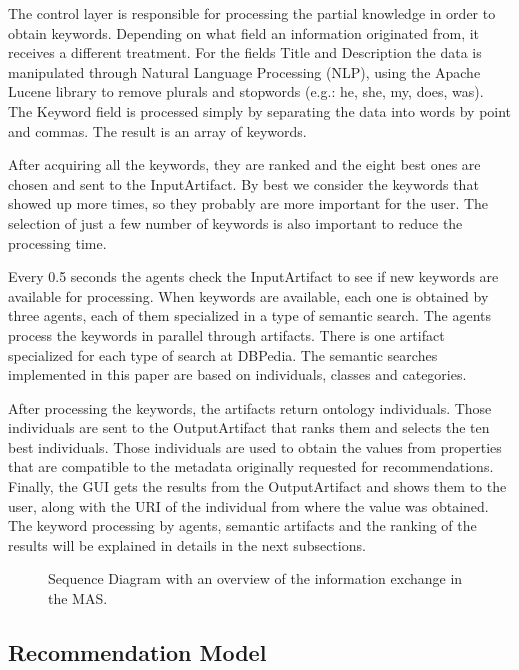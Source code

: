 \documentclass[a4paper,twoside]{article}
\begin{document}
The control layer is responsible for processing the partial knowledge in order to obtain keywords. Depending on what field an information originated from, it receives a different treatment. For the fields Title and Description the data is manipulated through Natural Language Processing (NLP), using the Apache Lucene library to remove plurals and stopwords (e.g.: he, she, my, does, was). The Keyword field is processed simply by separating the data into words by point and commas. The result is an array of keywords.

After acquiring all the keywords, they are ranked and the eight best ones are chosen and sent to the InputArtifact. By best we consider the keywords that showed up more times, so they probably are more important for the user. The selection of just a few number of keywords is also important to reduce the processing time.

Every 0.5 seconds the agents check the InputArtifact to see if new keywords are available for processing. When keywords are available, each one is obtained by three agents, each of them specialized in a type of semantic search. The agents process the keywords in parallel through artifacts. There is one artifact specialized for each type of search at DBPedia. The semantic searches implemented in this paper are based on individuals, classes and categories.

After processing the keywords, the artifacts return ontology individuals. Those individuals are sent to the OutputArtifact that ranks them and selects the ten best individuals. Those individuals are used to obtain the values from properties that are compatible to the metadata originally requested for recommendations. Finally, the GUI gets the results from the OutputArtifact and shows them to the user, along with the URI of the individual from where the value was obtained. The keyword processing by agents, semantic artifacts and the ranking of the results will be explained in details in the next subsections.

\begin{figure*}[!h]
  \centering
   {}
  \caption{Sequence Diagram with an overview of the information exchange in the MAS.}
  \label{fig:exampleX}
 \end{figure*}
 
\subsection{Recommendation Model}
\end{document}
